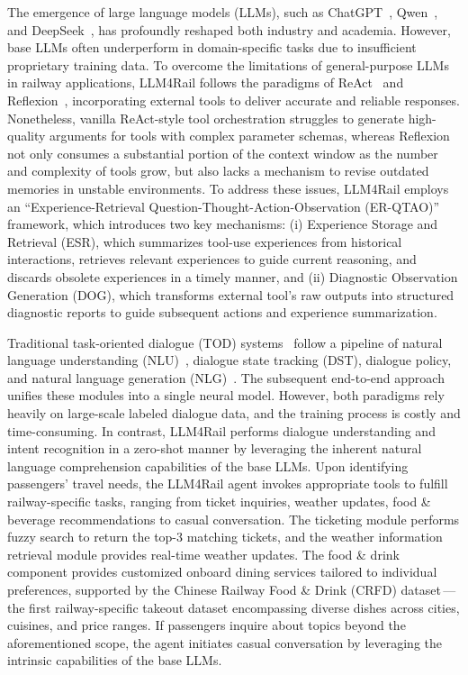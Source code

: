 \documentclass[runningheads]{llncs}
\begin{document}
The emergence of large language models (LLMs), such as ChatGPT~\cite{InstructGPT,GPT3,GPT4,gpt-4o}, Qwen~\cite{qwen,qwen3,qwenvl}, and DeepSeek~\cite{deepseek-v3,deepseek-r1}, has profoundly reshaped both industry and academia. 
However, base LLMs often underperform in domain-specific tasks due to insufficient proprietary training data. 
To overcome the limitations of general-purpose LLMs in railway applications, 
LLM4Rail follows the paradigms of ReAct~\cite{react} and 
Reflexion~\cite{reflexion}, incorporating external tools to deliver accurate 
and reliable responses.
Nonetheless, vanilla ReAct-style tool orchestration struggles to generate high-quality arguments for tools with complex parameter schemas, whereas Reflexion not only consumes a substantial portion of the context window as the number and complexity of tools grow, but also lacks a mechanism to revise outdated memories in unstable environments.
To address these issues, LLM4Rail employs an ``Experience-Retrieval Question-Thought-Action-Observation (ER-QTAO)'' framework, which introduces two key mechanisms: (i) Experience Storage and Retrieval (ESR), which summarizes tool-use experiences from historical interactions, retrieves relevant experiences to guide current reasoning, and discards obsolete experiences in a timely manner, and (ii) Diagnostic Observation Generation (DOG), which transforms external tool's raw outputs into structured diagnostic reports to guide subsequent actions and experience summarization.


Traditional task-oriented dialogue (TOD) systems~\cite{e2e_tod} follow a pipeline of natural language understanding (NLU)~\cite{attention_nlu,slot_nlu,cap_nlu,bert_nlu}, dialogue state tracking 
(DST), dialogue policy, and natural language generation (NLG)~\cite{tod_review}.
The subsequent end-to-end approach unifies these modules into a single neural model. 
However, both paradigms rely heavily on large-scale labeled dialogue data, and the training process is costly and time-consuming. 
In contrast, LLM4Rail performs dialogue understanding and intent recognition in a zero-shot manner by leveraging the inherent natural language comprehension capabilities of the base LLMs.
Upon identifying passengers' travel needs, the LLM4Rail agent invokes appropriate tools to fulfill railway-specific tasks, ranging from ticket inquiries, weather updates, food \& beverage recommendations to casual conversation.
The ticketing module performs fuzzy search to return the top-3 matching tickets, and the weather information retrieval module provides real-time weather updates.
The food \& drink component provides customized onboard dining services tailored to individual preferences, supported by the Chinese Railway Food \& Drink (CRFD) dataset\,---\,the first railway-specific takeout dataset encompassing diverse dishes across cities, cuisines, and price ranges. 
If passengers inquire about topics beyond the aforementioned scope, the agent initiates casual conversation by leveraging the intrinsic capabilities of the base LLMs.
\end{document}
